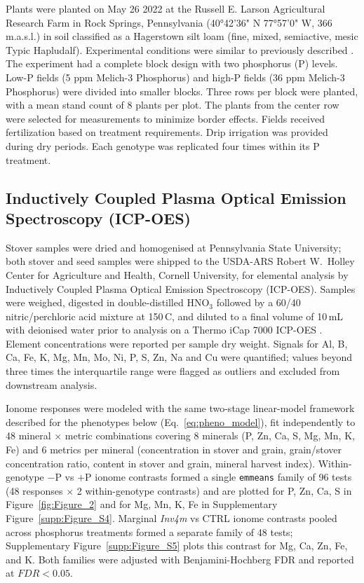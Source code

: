 \documentclass[9pt,twocolumn,twoside]{rilabRxiv}
\newcommand{\invfour}{\textit{Inv4m}\xspace}
\begin{document}
Plants were planted on May 26 2022 at the Russell E. Larson Agricultural Research Farm in Rock Springs, Pennsylvania (40°42'36" N 77°57'0" W, 366 m.a.s.l.) in soil classified as a Hagerstown silt loam (fine, mixed, semiactive, mesic Typic Hapludalf).
Experimental conditions were similar to previously described \cite{strock2018}. 
The experiment had a complete block design with two phosphorus (P) levels. 
Low-P fields (5 ppm Melich-3 Phosphorus) and high-P fields (36 ppm Melich-3 Phosphorus) were divided into smaller blocks. 
Three rows per block were planted, with a mean stand count of 8 plants per plot. 
The plants from the center row were selected for measurements to minimize border effects. 
Fields received fertilization based on treatment requirements. 
Drip irrigation was provided during dry periods. 
Each genotype was replicated four times within its P treatment.

\subsection*{Inductively Coupled Plasma Optical Emission Spectroscopy (ICP-OES)}

Stover samples were dried and homogenised at Pennsylvania State University; both stover and seed samples were shipped to the USDA-ARS Robert W.~Holley Center for Agriculture and Health, Cornell University, for elemental analysis by Inductively Coupled Plasma Optical Emission Spectroscopy (ICP-OES).
Samples were weighed, digested in double-distilled HNO$_3$ followed by a 60/40 nitric/perchloric acid mixture at 150\,\textdegree C, and diluted to a final volume of 10\,mL with deionised water prior to analysis on a Thermo iCap 7000 ICP-OES \cite{ishka2025}.
Element concentrations were reported per sample dry weight.
Signals for Al, B, Ca, Fe, K, Mg, Mn, Mo, Ni, P, S, Zn, Na and Cu were quantified; values beyond three times the interquartile range were flagged as outliers and excluded from downstream analysis.

Ionome responses were modeled with the same two-stage linear-model framework described for the phenotypes below (Eq.~\ref{eq:pheno_model}), fit independently to 48 mineral $\times$ metric combinations covering 8 minerals (P, Zn, Ca, S, Mg, Mn, K, Fe) and 6 metrics per mineral (concentration in stover and grain, grain/stover concentration ratio, content in stover and grain, mineral harvest index).
Within-genotype $-$P vs $+$P ionome contrasts formed a single \texttt{emmeans} \cite{lenth2023} family of 96 tests (48 responses $\times$ 2 within-genotype contrasts) and are plotted for P, Zn, Ca, S in Figure~\ref{fig:Figure_2} and for Mg, Mn, K, Fe in Supplementary Figure~\ref{supp:Figure_S4}.
Marginal \invfour vs CTRL ionome contrasts pooled across phosphorus treatments formed a separate family of 48 tests; Supplementary Figure~\ref{supp:Figure_S5} plots this contrast for Mg, Ca, Zn, Fe, and K.
Both families were adjusted with Benjamini-Hochberg FDR and reported at $\textit{FDR} < 0.05$.
\end{document}
